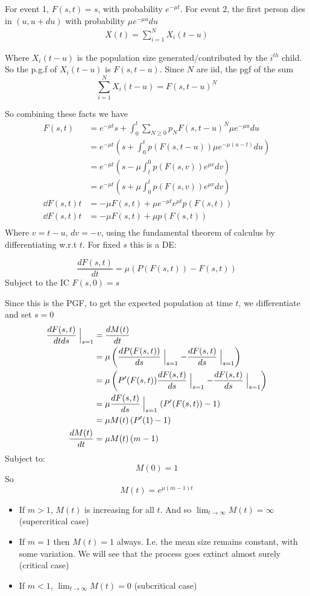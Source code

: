 \documentclass{X:/Documents/Coding/Latex/myassignment}
\begin{document}
For event 1, $F(s,t) = s$, with probability $e^{-\mu t}$.
For event 2, the first person dies in $(u,u+du)$ with probability $\mu e^{-\mu u} du$
\begin{align*}
    X(t) = \sum_{i=1}^N X_i(t-u)
\end{align*}

Where $X_i(t-u)$ is the population size generated/contributed by the $i^{th}$ child. So the p.g.f of $X_i(t-u)$ is $F(s,t-u)$. Since $N$ are iid, the pgf of the sum 
\[\sum_{i=1}^N X_i(t-u) = F(s,t-u)^N\]

So combining these facts we have
\begin{align*}
    F(s,t) &= e^{-\mu t} s + \int_0^t \sum_{N\geq 0} p_N F(s,t-u)^N \mu e^{-\mu u} du\\
    &= e^{-\mu t}\left( s + \int_0^t p(F(s,t-u)) \mu e^{-\mu (u-t)} du\right)\\
    &= e^{-\mu t}\left( s - \mu\int_t^0 p(F(s,v)) e^{\mu v} dv\right)\\
    &= e^{-\mu t}\left( s + \mu\int_0^t p(F(s,v)) e^{\mu v} dv\right)\\
    \dd{F(s,t)}{t} &= -\mu F(s,t) + \mu e^{-\mu t} e^{\mu t} p(F(s,t))\\
    \dd{F(s,t)}{t} &= -\mu F(s,t) + \mu p(F(s,t))\\
\end{align*}
Where $v=t-u$, $dv = -v$, using the fundamental theorem of calculus by differentiating w.r.t $t$. For fixed $s$ this is a DE:

\[\frac{dF(s,t)}{dt} = \mu(P(F(s,t)) - F(s,t))\]
Subject to the IC $F(s,0) = s$

Since this is the PGF, to get the expected population at time $t$, we differentiate and set $s=0$
\begin{align*}
    \frac{dF(s,t)}{dtds}\Bigm|_{s=1} &= \frac{dM(t)}{dt}\\
    &= \mu \left(\frac{dP(F(s,t))}{ds}\Bigm|_{s=1} - \frac{dF(s,t)}{ds}\Bigm|_{s=1}\right)\\
    &= \mu \left(P'(F(s,t)) \frac{dF(s,t)}{ds}\Bigm|_{s=1} - \frac{dF(s,t)}{ds}\Bigm|_{s=1}\right)\\
    &= \mu \frac{dF(s,t)}{ds}\Bigm|_{s=1}\left(P'(F(s,t)) - 1\right)\\
    &= \mu M(t)\left(P'(1) - 1\right)\\
    \frac{dM(t)}{dt}&= \mu M(t)\left(m - 1\right)\\
\end{align*}
Subject to:
\[M(0) = 1\]
So 
\[M(t) = e^{\mu(m-1)t}\]
\begin{itemize}
    \item If $m > 1$, $M(t)$ is increasing for all $t$. And so $\lim_{t\to\infty} M(t) = \infty$ (supercritical case)
    \item If $m =1$ then $M(t) = 1$ always. I.e. the mean size remains constant, with some variation. We will see that the process goes extinct almost surely (critical case)
    \item If $m < 1$, $\lim_{t\to\infty} M(t) = 0$ (subcritical case)
\end{itemize}
\end{document}
